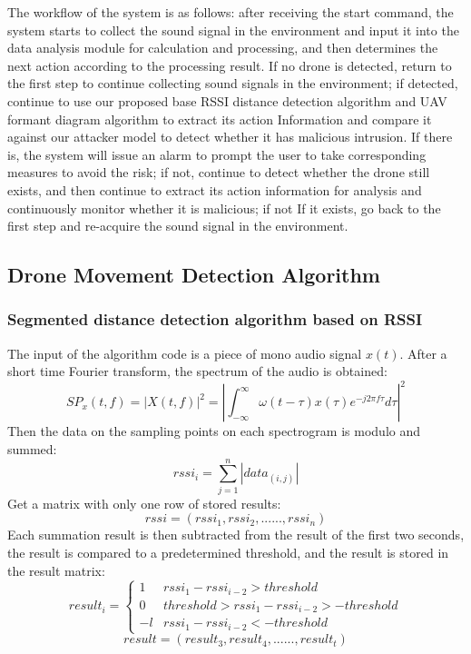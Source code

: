\documentclass{sig-alternate-10pt}
\begin{document}
The workflow of the system is as follows: after receiving the start command, the system starts to collect the sound signal in the environment and input it into the data analysis module for calculation and processing, and then determines the next action according to the processing result. If no drone is detected, return to the first step to continue collecting sound signals in the environment; if detected, continue to use our proposed base RSSI distance detection algorithm and UAV formant diagram algorithm to extract its action Information and compare it against our attacker model to detect whether it has malicious intrusion. If there is, the system will issue an alarm to prompt the user to take corresponding measures to avoid the risk; if not, continue to detect whether the drone still exists, and then continue to extract its action information for analysis and continuously monitor whether it is malicious; if not If it exists, go back to the first step and re-acquire the sound signal in the environment.


\subsection{Drone Movement Detection Algorithm}
\subsubsection{Segmented distance detection algorithm based on RSSI}
The input of the algorithm code is a piece of mono audio signal $x(t)$. After a short time Fourier transform, the spectrum of the audio is obtained:
$$SP_x(t,f)=|X(t,f)|^2=|\int_{-\infty}^\infty\omega(t-\tau)x(\tau)e^{-j2\pi f\tau}d\tau|^2$$
Then the data on the sampling points on each spectrogram is modulo and summed:
$$rssi_i=\sum_{j=1}^n|data_{(i,j)}|$$
Get a matrix with only one row of stored results:
$$rssi=(rssi_1,rssi_2,......,rssi_n)$$
Each summation result is then subtracted from the result of the first two seconds, the result is compared to a predetermined threshold, and the result is stored in the result matrix:
$$
result_i = \left\{ \begin{array}{ll}
1 & \textrm{$rssi_1-rssi_{i-2}>threshold$}\\
0 & \textrm{$threshold>rssi_1-rssi_{i-2}>-threshold$}\\
-l & \textrm{$rssi_1-rssi_{i-2}<-threshold$}
\end{array} \right.
$$
$$result=(result_3,result_4,......,result_t)$$
\end{document}
